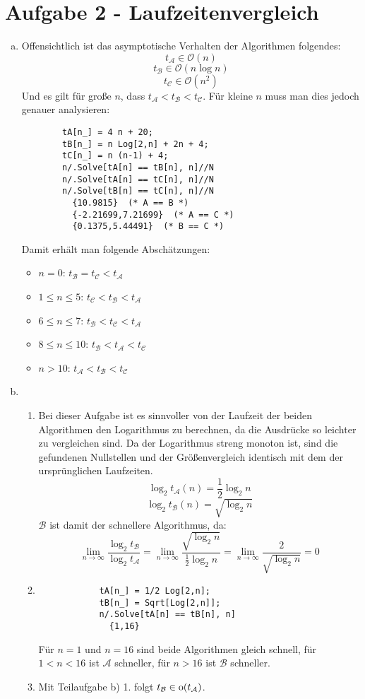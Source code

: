 \section*{Aufgabe 2 - Laufzeitenvergleich}
\begin{enumerate}[a)]
\item
	Offensichtlich ist das asymptotische Verhalten der Algorithmen folgendes:
	\[ t_\mathcal{A} \in \mathcal{O}(n) \]
	\[ t_\mathcal{B} \in \mathcal{O}(n \log n) \]
	\[ t_\mathcal{C} \in \mathcal{O}(n^2) \]
	Und es gilt für große $n$, dass $t_\mathcal{A} < t_\mathcal{B} < t_\mathcal{C}$.
	Für kleine $n$ muss man dies jedoch genauer analysieren:
	\lstset{language=Mathematica}
	\begin{lstlisting}
		tA[n_] = 4 n + 20;
		tB[n_] = n Log[2,n] + 2n + 4;
		tC[n_] = n (n-1) + 4;
		n/.Solve[tA[n] == tB[n], n]//N
		n/.Solve[tA[n] == tC[n], n]//N
		n/.Solve[tB[n] == tC[n], n]//N
		  {10.9815}  (* A == B *)
		  {-2.21699,7.21699}  (* A == C *)
		  {0.1375,5.44491}  (* B == C *)
	\end{lstlisting}
	Damit erhält man folgende Abschätzungen:
	\begin{itemize}
		\item $n=0$: $t_\mathcal{B} = t_\mathcal{C} < t_\mathcal{A}$
		\item $1 \leq n \leq 5$: $t_\mathcal{C} < t_\mathcal{B} < t_\mathcal{A}$
		\item $6 \leq n \leq 7$: $t_\mathcal{B} < t_\mathcal{C} < t_\mathcal{A}$
		\item $8 \leq n \leq 10$: $t_\mathcal{B} < t_\mathcal{A} < t_\mathcal{C}$
		\item $n > 10$: $t_\mathcal{A} < t_\mathcal{B} < t_\mathcal{C}$
	\end{itemize}

\item 
	\begin{enumerate}[1.]
	\item
		Bei dieser Aufgabe ist es sinnvoller von der Laufzeit der beiden Algorithmen den Logarithmus zu berechnen,
		da die Ausdrücke so leichter zu vergleichen sind. Da der Logarithmus streng monoton ist,
		sind die gefundenen Nullstellen und der Größenvergleich identisch mit dem der ursprünglichen Laufzeiten.
		\[ \log_2 t_\mathcal{A}(n) = \frac{1}{2} \log_2 n \]
		\[ \log_2 t_\mathcal{B}(n) = \sqrt{\log_2 n} \]
		$\mathcal{B}$ ist damit der schnellere Algorithmus, da:
		\[ \lim_{n \rightarrow \infty} \frac{\log_2 t_\mathcal{B}}{\log_2 t_\mathcal{A}} = 
		   \lim_{n \rightarrow \infty} \frac{\sqrt{\log_2 n}}{\frac{1}{2} \log_2 n} =
		   \lim_{n \rightarrow \infty} \frac{2}{\sqrt{\log_2 n}} = 0 \]
	\item
		\begin{lstlisting}
			tA[n_] = 1/2 Log[2,n];
			tB[n_] = Sqrt[Log[2,n]];
			n/.Solve[tA[n] == tB[n], n]
			  {1,16}
		\end{lstlisting}
		Für $n=1$ und $n=16$ sind beide Algorithmen gleich schnell, für $1 < n < 16$ ist $\mathcal{A}$ schneller,
		für $n > 16$ ist $\mathcal{B}$ schneller.
	
	\item
		Mit Teilaufgabe b) 1. folgt $t_\mathcal{B} \in \hbox{o}(t_\mathcal{A})$.
	\end{enumerate}
\end{enumerate}
